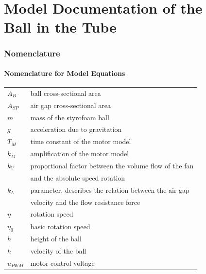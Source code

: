 \documentclass[10pt,a4paper]{article}
\begin{document}
	\part*{Model Documentation of the \\ Ball in the Tube} %
	
	
	\section{Nomenclature} %
	\subsection{Nomenclature for Model Equations} %
	
	\begin{tabular}{ll}
		$A_B$ & ball cross-sectional area \\
		$A_{SP}$ & air gap cross-sectional area \\
		$m$ & mass of the styrofoam ball \\
		$g$ & acceleration due to gravitation \\
		$T_M$ & time constant of the motor model\\
		$k_M$ & amplification of the motor model\\
		$k_V$ & proportional factor between the volume flow of the fan \\
		& and the absolute speed rotation\\
		$k_L$ & parameter, describes the relation between the air gap \\
		& velocity and the flow resistance force\\
		$\eta$ & rotation speed \\
		$\eta_0$ & basic rotation speed\\
		$h$ & height of the ball \\
		$\dot{h}$ & velocity of the ball \\
		$u_{PWM}$ & motor control voltage \\		
	\end{tabular}
	 
\end{document}
